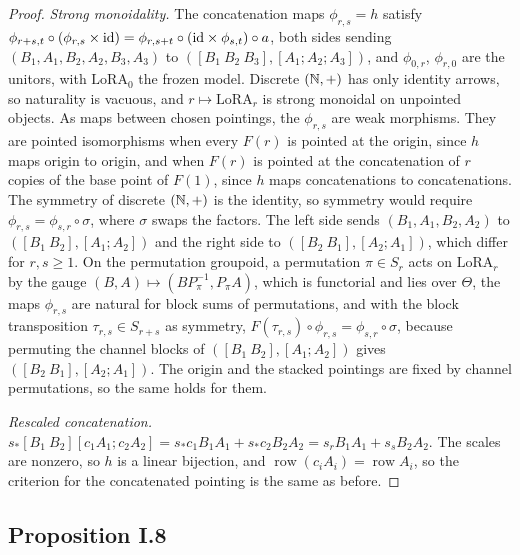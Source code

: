 \begin{proof}
\emph{Strong monoidality.} The concatenation maps $\phi_{r,s}=h$ satisfy
$\phi_{r+s,t}\circ(\phi_{r,s}\times\mathrm{id})=\phi_{r,s+t}\circ(\mathrm{id}\times\phi_{s,t})\circ a$, both sides sending
$(B_1,A_1,B_2,A_2,B_3,A_3)$ to $([B_1\ B_2\ B_3],[A_1;A_2;A_3])$, and $\phi_{0,r}$, $\phi_{r,0}$ are the unitors, with
$\mathrm{LoRA}_0$ the frozen model. Discrete $(\mathbb{N},+)$ has only identity arrows, so naturality is vacuous, and $r\mapsto
\mathrm{LoRA}_r$ is strong monoidal on unpointed objects. As maps between chosen pointings, the $\phi_{r,s}$ are weak
morphisms. They are pointed isomorphisms when every $F(r)$ is pointed at the origin, since $h$ maps origin to origin, and
when $F(r)$ is pointed at the concatenation of $r$ copies of the base point of $F(1)$, since $h$ maps concatenations to
concatenations. The symmetry of discrete $(\mathbb{N},+)$ is the identity, so symmetry would require $\phi_{r,s}=\phi_{s,r}\circ
\sigma$, where $\sigma$ swaps the factors. The left side sends $(B_1,A_1,B_2,A_2)$ to $([B_1\ B_2],[A_1;A_2])$ and the
right side to $([B_2\ B_1],[A_2;A_1])$, which differ for $r,s\ge1$. On the permutation groupoid, a permutation $\pi\in S_r$
acts on $\mathrm{LoRA}_r$ by the gauge $(B,A)\mapsto(BP_\pi^{-1},P_\pi A)$, which is functorial and lies over $\Theta$, the
maps $\phi_{r,s}$ are natural for block sums of permutations, and with the block transposition $\tau_{r,s}\in S_{r+s}$ as
symmetry, $F(\tau_{r,s})\circ\phi_{r,s}=\phi_{s,r}\circ\sigma$, because permuting the channel blocks of
$([B_1\ B_2],[A_1;A_2])$ gives $([B_2\ B_1],[A_2;A_1])$. The origin and the stacked pointings are fixed by channel
permutations, so the same holds for them.

\emph{Rescaled concatenation.} $s_*[B_1\ B_2][c_1A_1;c_2A_2]=s_*c_1B_1A_1+s_*c_2B_2A_2=s_rB_1A_1+s_sB_2A_2$. The scales
are nonzero, so $h$ is a linear bijection, and $\operatorname{row}(c_iA_i)=\operatorname{row}A_i$, so the criterion for
the concatenated pointing is the same as before.
\end{proof}

\subsection{Proposition I.8}\label{proof:I.8}

